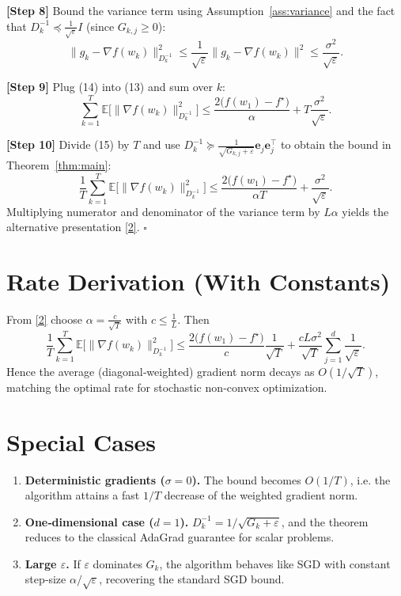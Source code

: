 \documentclass{article}
\newcommand{\E}{\mathbb{E}}
\begin{document}
\noindent\textbf{[Step 8]} Bound the variance term using Assumption~\ref{ass:variance} and the fact that $D_k^{-1}\preceq \frac{1}{\sqrt{\varepsilon}}I$ (since $G_{k,j}\ge0$):
\[
\|g_k-\nabla f(w_k)\|_{D_k^{-1}}^{2}
\le \frac{1}{\sqrt{\varepsilon}}\|g_k-\nabla f(w_k)\|^{2}
\le \frac{\sigma^{2}}{\sqrt{\varepsilon}}.
\tag{14}
\]

\noindent\textbf{[Step 9]} Plug (14) into (13) and sum over $k$:
\[
\sum_{k=1}^{T}\E\!\bigl[\|\nabla f(w_k)\|_{D_k^{-1}}^{2}\bigr]
\le \frac{2\bigl(f(w_1)-f^{\star}\bigr)}{\alpha}
+ T\frac{\sigma^{2}}{\sqrt{\varepsilon}}.
\tag{15}
\]

\noindent\textbf{[Step 10]} Divide (15) by $T$ and use $D_k^{-1}\succeq \frac{1}{\sqrt{G_{k,j}+\varepsilon}}\mathbf e_j\mathbf e_j^{\top}$ to obtain the bound in Theorem~\ref{thm:main}:
\[
\frac{1}{T}\sum_{k=1}^{T}\E\!\bigl[\|\nabla f(w_k)\|_{D_k^{-1}}^{2}\bigr]
\le \frac{2\bigl(f(w_1)-f^{\star}\bigr)}{\alpha T}
+ \frac{\sigma^{2}}{\sqrt{\varepsilon}}.
\]
Multiplying numerator and denominator of the variance term by $L\alpha$ yields the alternative presentation \eqref{2}. \hfill $\square$

\section*{Rate Derivation (With Constants)}
From \eqref{2} choose $\alpha = \frac{c}{\sqrt{T}}$ with $c\le \frac{1}{L}$. Then
\[
\frac{1}{T}\sum_{k=1}^{T}\E\!\bigl[\|\nabla f(w_k)\|_{D_k^{-1}}^{2}\bigr]
\le \frac{2\bigl(f(w_1)-f^{\star}\bigr)}{c}\frac{1}{\sqrt{T}}
+ \frac{cL\sigma^{2}}{\sqrt{T}} \sum_{j=1}^{d}\frac{1}{\sqrt{\varepsilon}} .
\]
Hence the average (diagonal‑weighted) gradient norm decays as $O(1/\sqrt{T})$, matching the optimal rate for stochastic non‑convex optimization.

\section*{Special Cases}
\begin{enumerate}[leftmargin=*]
\item \textbf{Deterministic gradients ($\sigma=0$).} The bound becomes $O(1/T)$, i.e. the algorithm attains a fast $1/T$ decrease of the weighted gradient norm.
\item \textbf{One‑dimensional case ($d=1$).} $D_k^{-1}=1/\sqrt{G_k+\varepsilon}$, and the theorem reduces to the classical AdaGrad guarantee for scalar problems.
\item \textbf{Large $\varepsilon$.} If $\varepsilon$ dominates $G_k$, the algorithm behaves like SGD with constant step‑size $\alpha/\sqrt{\varepsilon}$, recovering the standard SGD bound.
\end{enumerate}
\end{document}
